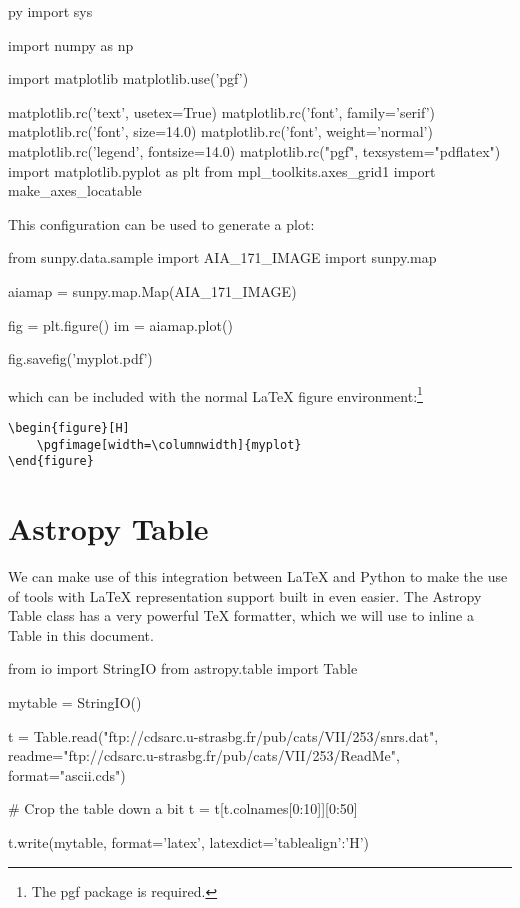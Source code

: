 \documentclass[]{article}
\begin{document}
\begin{pyverbatim}
\begin{pythontexcustomcode}{py}
import sys

import numpy as np

import matplotlib
matplotlib.use('pgf')

matplotlib.rc('text', usetex=True)
matplotlib.rc('font', family='serif')
matplotlib.rc('font', size=14.0)
matplotlib.rc('font', weight='normal')
matplotlib.rc('legend', fontsize=14.0)
matplotlib.rc("pgf", texsystem="pdflatex")
import matplotlib.pyplot as plt
from mpl_toolkits.axes_grid1 import make_axes_locatable


\end{pythontexcustomcode}
\end{pyverbatim}

This configuration can be used to generate a plot:

\begin{pyblock}
from sunpy.data.sample import AIA_171_IMAGE
import sunpy.map

aiamap = sunpy.map.Map(AIA_171_IMAGE)

fig = plt.figure()
im = aiamap.plot()

fig.savefig('myplot.pdf')
\end{pyblock}

which can be included with the normal LaTeX figure environment:\footnote{The pgf package is required.}

\begin{verbatim}
\begin{figure}[H]
	\pgfimage[width=\columnwidth]{myplot}
\end{figure}
\end{verbatim}

\begin{figure}[H]
\end{figure}

\section{Astropy Table}

We can make use of this integration between LaTeX and Python to make the use of tools with LaTeX representation support built in even easier.
The Astropy Table class has a very powerful TeX formatter, which we will use to inline a Table in this document.

\begin{pyblock}
from io import StringIO
from astropy.table import Table

mytable = StringIO()

t = Table.read("ftp://cdsarc.u-strasbg.fr/pub/cats/VII/253/snrs.dat",
	           readme="ftp://cdsarc.u-strasbg.fr/pub/cats/VII/253/ReadMe",
	           format="ascii.cds")

# Crop the table down a bit
t = t[t.colnames[0:10]][0:50]

t.write(mytable, format='latex', latexdict={'tablealign':'H'})

\end{pyblock}
\end{document}
